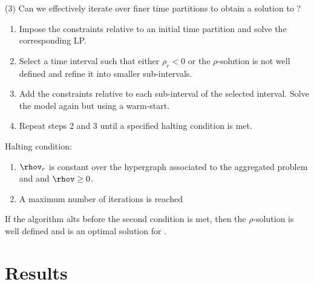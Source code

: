 \begin{frame}{(3) Can we effectively iterate over finer time partitions to obtain a solution to \CEPT?}
\begin{enumerate}
    \item Impose the constraints relative to an initial time partition and solve the corresponding LP.
    \item Select a time interval such that either \(\rho_r < 0\) or the \(\rho\)-solution is not well defined and refine it into smaller sub-intervals.
    \item Add the constraints relative to each sub-interval of the selected interval. Solve the model again but using a warm-start.
    \item Repeat steps 2 and 3 until a specified halting condition is met.
    \end{enumerate}
    \vspace{1cm}
    Halting condition:
    \begin{enumerate}
        \item \(\rhov_r\) is constant over the hypergraph associated to the aggregated problem \CEPP and  and \(\rhov \geq 0\). \label{eq: condition 2 iter}
        \item A maximum number of iterations is reached
    \end{enumerate}
    
    \begin{observation}
        If the algorithm alts before the second condition is met, then the \(\rho\)-solution is well defined and is an optimal solution for \CEPT.
    \end{observation}
\end{frame}

\section{Results}

